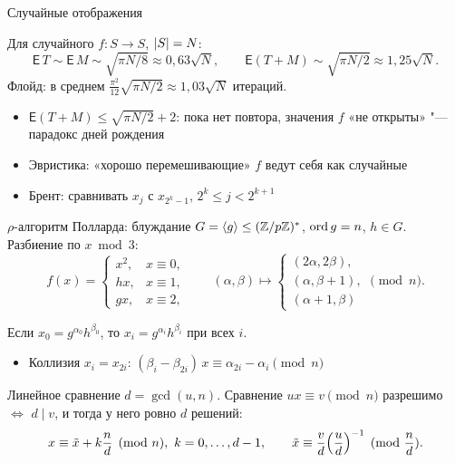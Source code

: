 \documentclass{ca-slides}
\begin{document}
\begin{canvasframe}{Случайные отображения}
  \begin{theorem}
    Для случайного $f\colon S \to S$, $\lvert S\rvert = N$:
    \[\mathsf{E}\,T \sim \mathsf{E}\,M \sim \sqrt{\pi N/8} \approx 0{,}63\sqrt N, \qquad
      \mathsf{E}(T + M) \sim \sqrt{\pi N/2} \approx 1{,}25\sqrt N.\]
    Флойд: в среднем $\frac{\pi^2}{12}\sqrt{\pi N/2} \approx 1{,}03\sqrt N$ итераций.
  \end{theorem}
  \begin{itemize}
    \item $\mathsf{E}(T + M) \le \sqrt{\pi N/2} + 2$: пока нет повтора, значения $f$
      «не открыты» "--- парадокс дней рождения
    \item Эвристика: «хорошо перемешивающие» $f$ ведут себя как случайные
    \item Брент: сравнивать $x_j$ с $x_{2^k - 1}$, $2^k \le j < 2^{k+1}$
  \end{itemize}
\end{canvasframe}

\begin{canvasframe}{$\rho$-алгоритм Полларда: блуждание}
  $G = \langle g \rangle \le (\mathbb{Z}/p\mathbb{Z})^{*}$, $\operatorname{ord} g = n$, $h \in G$. Разбиение по $x \bmod 3$:
  \[
    f(x) = \begin{cases} x^2, & x \equiv 0,\\ h x, & x \equiv 1,\\ g x, & x \equiv 2, \end{cases}
    \qquad
    (\alpha, \beta) \mapsto \begin{cases} (2\alpha, 2\beta),\\ (\alpha, \beta + 1),\\
      (\alpha + 1, \beta) \end{cases} \pmod n.
  \]
  \begin{lemma}
    Если $x_0 = g^{\alpha_0} h^{\beta_0}$, то $x_i = g^{\alpha_i} h^{\beta_i}$ при всех $i$.
  \end{lemma}
  \begin{itemize}
    \item Коллизия $x_i = x_{2i}$: \quad
      $(\beta_i - \beta_{2i})\,x \equiv \alpha_{2i} - \alpha_i \pmod n$
  \end{itemize}
\end{canvasframe}

\begin{theoremframe}[lemma]{Линейное сравнение}
  $d = \gcd(u, n)$. Сравнение $ux \equiv v \pmod n$ разрешимо $\iff$ $d \mid v$, и тогда
  у него ровно $d$ решений:
  \[x \equiv \tilde x + k\frac nd \pmod n,\ k = 0, \dots, d - 1, \qquad
    \tilde x \equiv \frac vd\Bigl(\frac ud\Bigr)^{-1} \pmod{\frac nd}.\]
\end{theoremframe}
\end{document}
